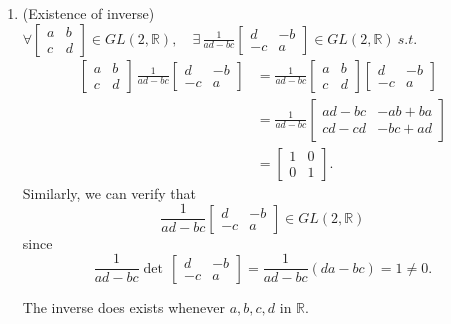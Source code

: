 \begin{solution}
\begin{enumerate}
        \item (Existence of inverse) $\forall \begin{bmatrix}
            a & b\\ c & d
        \end{bmatrix} \in GL(2, \mathbb{R}), \quad \exists\,  \displaystyle \frac{1}{ad-bc} \begin{bmatrix}
            d & -b\\-c & a
        \end{bmatrix}\in GL(2, \mathbb{R}) \> s.t$.
        \begin{align*}
            \begin{bmatrix}
                a & b\\ c & d
            \end{bmatrix}\, 
            \frac{1}{ad-bc} \begin{bmatrix}
                d & -b\\-c & a
            \end{bmatrix} &= 
            \frac{1}{ad-bc}\begin{bmatrix}
                a & b\\ c & d
            \end{bmatrix}
            \begin{bmatrix}
                d & -b\\-c & a
            \end{bmatrix}\\
            &= \frac{1}{ad-bc} \begin{bmatrix}
                ad-bc & -ab+ba\\ cd-cd & -bc+ad
            \end{bmatrix}\\
            &= \begin{bmatrix}
                1 & 0\\ 0& 1
            \end{bmatrix}.
        \end{align*}
        Similarly, we can verify that 
            \[
                \frac{1}{ad-bc} \begin{bmatrix}
                    d & -b\\-c & a
                \end{bmatrix} \in GL(2, \mathbb{R})
            \]
            since 
            \[
                \frac{1}{ad-bc} \det\, \begin{bmatrix}
                    d & -b\\-c & a
                \end{bmatrix} = \frac{1}{ad-bc}(da-bc) = 1 \neq 0.
            \]

            The inverse does exists whenever $a, b, c, d$ in $\mathbb{R}$.
    \end{enumerate}
\end{solution}

